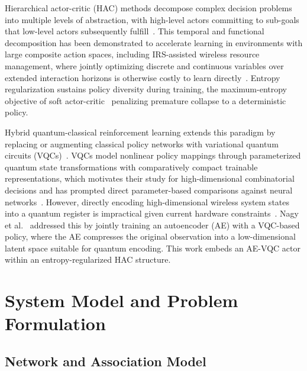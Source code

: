 \documentclass[12pt,onecolumn]{IEEEtran}
\begin{document}
Hierarchical actor-critic (HAC) methods decompose complex decision problems into multiple levels of abstraction, with high-level actors committing to sub-goals that low-level actors subsequently fulfill~\cite{levy2019learning, bacon2017option}.
This temporal and functional decomposition has been demonstrated to accelerate learning in environments with large composite action spaces, including IRS-assisted wireless resource management, where jointly optimizing discrete and continuous variables over extended interaction horizons is otherwise costly to learn directly~\cite{gong2023hierarchical}.
Entropy regularization sustains policy diversity during training, the maximum-entropy objective of soft actor-critic~\cite{haarnoja2018soft} penalizing premature collapse to a deterministic policy.

Hybrid quantum-classical reinforcement learning extends this paradigm by replacing or augmenting classical policy networks with variational quantum circuits
(VQCs)~\cite{jerbi2021parametrized,kruse2023variational}.
VQCs model nonlinear policy mappings through parameterized quantum state transformations with comparatively compact trainable representations, which motivates their study for high-dimensional combinatorial
decisions and has prompted direct parameter-based comparisons against neural
networks~\cite{kolle2025evaluating}.
However, directly encoding high-dimensional wireless system states into a quantum register is impractical given current hardware constraints~\cite{preskill2018quantum}.
Nagy et al.~\cite{nagy2025hybrid} addressed this by jointly training an autoencoder (AE) with a VQC-based policy, where the AE compresses the original observation into a low-dimensional latent space suitable for quantum encoding.
This work embeds an AE-VQC actor within an entropy-regularized HAC structure.

\section{System Model and Problem Formulation}
\label{sec:model}

\subsection{Network and Association Model}
\end{document}
